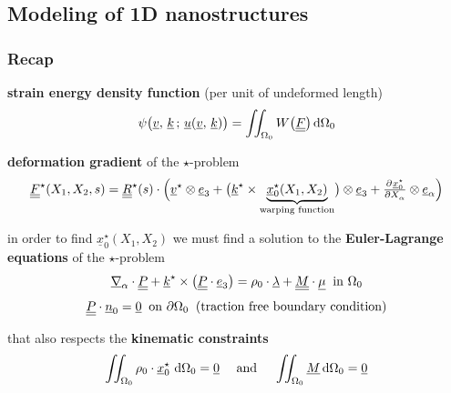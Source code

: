 \subsection{Modeling of 1D nanostructures}

\begin{frame}
  \frametitle{Recap}

  \textbf{strain energy density function} (per unit of undeformed length)
  \begin{displaymath}
    \psi \bigl( \underline{v} , \, \underline{k} \, ; \, \underline{u}(\underline{v} , \, \underline{k}) \bigr) =
    \iint_{\Omega_0} W \bigl( \doubleunderline{F} \bigr) \dif \Omega_0
  \end{displaymath}
  
  \textbf{deformation gradient} of the $\star$-problem
  \begin{displaymath}
    \doubleunderline{F}^{\star}(X_1,X_2,s) =
    \doubleunderline{R}^{\star}(s) \cdot \Bigl(
      \underline{v}^{\star} \otimes \underline{e}_3 +
      \bigl( \underline{k}^{\star} \times \underbrace{ \underline{x}_0^{\star}(X_1,X_2) }_{\text{warping function}} \bigr) \otimes \underline{e}_3 +
      \pd{\underline{x}_0^{\star}}{X_{\alpha}} \otimes \underline{e}_{\alpha}
    \Bigr)
  \end{displaymath}
  
  in order to find $\underline{x}_0^{\star}(X_1,X_2)$ we must find a solution to the
  \textbf{Euler-Lagrange equations} of the $\star$-problem
  \begin{displaymath}
    \underline{\nabla}_{\alpha} \cdot \underline{\underline{P}} +
    \underline{k}^{\star} \times \bigl( \underline{\underline{P}} \cdot \underline{e}_3 \bigr) =
    \rho_0 \cdot \underline{\lambda} +
    \underline{\underline{M}} \cdot \underline{\mu}
    \: \text{ in } \Omega_0    
  \end{displaymath}
  \begin{displaymath}
    \underline{\underline{P}} \cdot \underline{n}_0 = \underline{0}
    \: \text{ on } \partial \Omega_0
    \: \text{ (traction free boundary condition)}
  \end{displaymath}
  
  \vspace{0.5em}
  that also respects the \textbf{kinematic constraints}
  \begin{displaymath}
    \iint_{\Omega_0} \rho_0 \cdot \underline{x}_0^{\star} \, \dif \Omega_0 = \underline{0}
    \quad \text{ and } \quad
    \iint_{\Omega_0} \underline{M} \dif \Omega_0 = \underline{0}
  \end{displaymath}

\end{frame}


